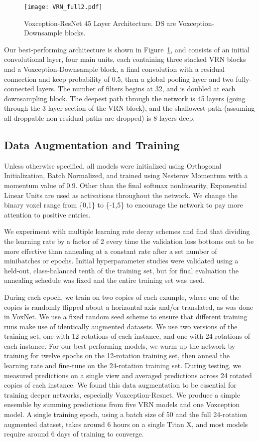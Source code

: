 \documentclass{article}
\begin{document}
\begin{figure}[ht]
  \centering
  \texttt{[image: VRN\_full2.pdf]}
  \caption{Voxception-ResNet 45 Layer Architecture. DS are Voxception-Downsample blocks.}
  \label{VRNFULL}
\end{figure}
Our best-performing architecture is shown in Figure~\ref{VRNFULL}, and consists of an initial convolutional layer, four main units, each containing three stacked VRN blocks and a Voxception-Downsample block, a final convolution with a residual connection and keep probability of 0.5, then a global pooling layer and two fully-connected layers. The number of filters begins at 32, and is doubled at each downsampling block. The deepest path through the network is 45 layers (going through the 3-layer section of the VRN block), and the shallowest path (assuming all droppable non-residual paths are dropped) is 8 layers deep.

\subsection{Data Augmentation and Training}

Unless otherwise specified, all models were initialized using Orthogonal Initialization\citep{orthog}, Batch Normalized\citep{Bnorm}, and trained using Nesterov Momentum\citep{Nesterov} with a momentum value of 0.9. Other than the final softmax nonlinearity, Exponential Linear Units\citep{ELU} are used as activations throughout the network. We change the binary voxel range from \{0,1\} to \{-1,5\} to encourage the network to pay more attention to positive entries.

We experiment with multiple learning rate decay schemes and find that dividing the learning rate by a factor of 2 every time the validation loss bottoms out to be more effective than annealing at a constant rate after a set number of minibatches or epochs. Initial hyperparameter studies were validated using a held-out, class-balanced tenth of the training set, but for final evaluation the annealing schedule was fixed and the entire training set was used. 

During each epoch, we train on two copies of each example, where one of the copies is randomly flipped about a horizontal axis and/or translated, as was done in VoxNet\citep{VoxNet}. We use a fixed random seed scheme to ensure that different training runs make use of identically augmented datasets. We use two versions of the training set, one with 12 rotations of each instance, and one with 24 rotations of each instance. For our best performing models, we warm up the network by training for twelve epochs on the 12-rotation training set, then anneal the learning rate and fine-tune on the 24-rotation training set. During testing, we measured predictions on a single view and averaged predictions across 24 rotated copies of each instance. We found this data augmentation to be essential for training deeper networks, especially Voxception-Resnet. We produce a simple ensemble by summing predictions from five VRN models and one Voxception model. A single training epoch, using a batch size of 50 and the full 24-rotation augmented dataset, takes around 6 hours on a single Titan X, and most models require around 6 days of training to converge.
\end{document}

